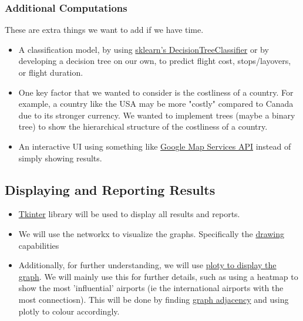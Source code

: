 \documentclass[fontsize=11pt]{article}
\begin{document}
    \subsubsection{Additional Computations}
        These are extra things we want to add if we have time.
        \begin{itemize}
            \item A classification model, by using \href{https://scikit-learn.org/stable/modules/generated/sklearn.tree.DecisionTreeClassifier.html}{sklearn's DecisionTreeClassifier} or by developing a decision tree on our own, to predict flight cost, stops/layovers, or flight duration.
            \item One key factor that we wanted to consider is the costliness of a country. For example, a country like the USA may be more "costly" compared to Canada due to its stronger currency. We wanted to implement trees (maybe a binary tree) to show the hierarchical structure of the costliness of a country.
            \item An interactive UI using something like \href{https://github.com/googlemaps/google-maps-services-python}{Google Map Services API} instead of simply showing results.
        \end{itemize}
\subsection{Displaying and Reporting Results}
    \begin{itemize}
        \item \href{https://docs.python.org/3/library/tk.html}{Tkinter} library will be used to display all results and reports. 
        \item We will use the networkx to visualize the graphs. Specifically the \href{https://networkx.org/documentation/stable/reference/drawing.html}{drawing} capabilities 
        \item Additionally, for further understanding, we will use \href{https://plotly.com/python/network-graphs/}{ploty to display the graph}. We will mainly use this for further details, such as using a heatmap to show the most 'influential' airports (ie the international airports with the most connectiosn). This will be done by finding \href{https://networkx.org/documentation/stable/reference/classes/generated/networkx.Graph.adjacency.html}{graph adjacency} and using plotly to colour accordingly.
    \end{itemize}
\end{document}
